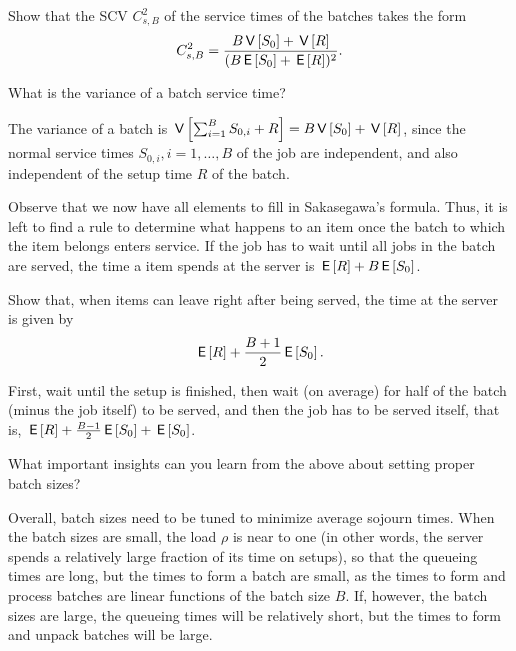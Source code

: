 \begin{exercise}
Show that the SCV $C_{s,B}^2$ of the service times of the batches takes the form
\begin{equation}\label{eq:84}
C_{s, B}^2 = \frac{B \,\mathsf{V}\left[S_0\right] + \,\mathsf{V}\left[R\right]}{(B \,\mathsf{E}\left[S_0\right] + \,\mathsf{E}\left[R\right])^2}.
\end{equation}
\begin{hint}
 What is the variance of a batch service time?
\end{hint}
\begin{solution}
 The variance of a batch is $\,\mathsf{V}\left[\sum_{i=1}^B S_{0,i} + R\right] = B\,\mathsf{V}\left[S_0\right] + \,\mathsf{V}\left[R\right]$, since the normal service times $S_{0,i}, i=1,\ldots, B$ of the job are independent, and also independent of the setup time $R$ of the batch.
\end{solution}
\end{exercise}

Observe that we now have all elements to fill in Sakasegawa's formula.
Thus, it is left to find a rule to determine what happens to an item once the batch to which the item belongs enters service.
If the job has to wait until all jobs in the batch are served, the time a item spends at the server is $\,\mathsf{E}\left[R\right] + B \,\mathsf{E}\left[S_0\right]$.


\begin{exercise}
Show that, when items can leave right after being served, the time at the server is given by
\begin{equation}\label{eq:85}
\,\mathsf{E}\left[R\right] + \frac{B+1}{2}\,\mathsf{E}\left[S_0\right].
\end{equation}
\begin{solution}
 First, wait until the setup is finished, then wait (on average) for half of the batch (minus the job itself) to be served, and then the job has to be served itself, that is,
$\,\mathsf{E}\left[R\right] + \frac{B-1}{2}\,\mathsf{E}\left[S_0\right] +\,\mathsf{E}\left[S_0\right]$.
\end{solution}
\end{exercise}


\begin{exercise}
  What important insights can you learn from the above about setting proper batch sizes?
\begin{solution}
 Overall, batch sizes need to be tuned to minimize average sojourn times.
 When the batch sizes are small, the load $\rho$ is near to one (in other words, the server spends a relatively large fraction of its time on setups), so that the queueing times are long, but the times to form a batch are small, as the times to form and process batches are linear functions of the batch size $B$.
 If, however, the batch sizes are large, the queueing times will be relatively short, but the times to form and unpack batches will be large.
\end{solution}
\end{exercise}

